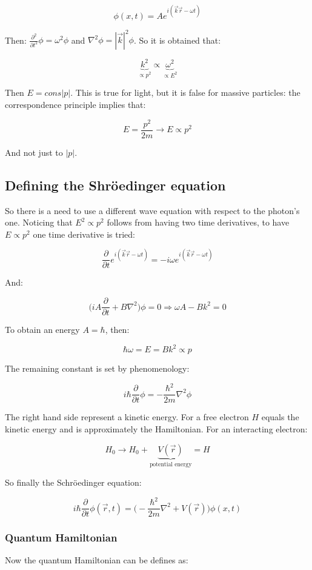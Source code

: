   $$\phi(x,t) = Ae^{i(\vec{k}\vec{r}-\omega t)}$$

  Then: $\frac{\partial^2{}}{\partial{t^2}}\phi = \omega^2\phi$ and $\nabla^2\phi = |\vec{k}|^2\phi$.
  So it is obtained that: 

  $$\underbrace{k^2}_{\propto p^2}\propto\underbrace{\omega^2}_{\propto E^2}$$

  Then $E = cons|p|$.
  This is true for light, but it is false for massive particles: the correspondence principle implies that:

  $$E = \frac{p^2}{2m}\rightarrow E\propto p^2$$

  And not just to $|p|$.

  \subsection{Defining the Shr\"oedinger equation}
  So there is a need to use a different wave equation with respect to the photon's one.
  Noticing that $E^2\propto p^2$ follows from having two time derivatives, to have $E\propto p^2$ one time derivative is tried:

  $$\frac{\partial {}}{\partial {t}}e^{i(\vec{k}\vec{r}-\omega t)} = -i\omega e^{i(\vec{k}\vec{r}-\omega t)}$$

  And:

  $$\biggl(iA \frac{\partial {}}{\partial {t}}+ B\nabla^2\biggr)\phi = 0\Rightarrow \omega A - B k^2 = 0$$

  To obtain an energy $A = \hbar$, then:

  $$\hbar\omega = E = Bk^2\propto p$$

  The remaining constant is set by phenomenology:

  $$i\hbar \frac{\partial {}}{\partial {t}}\phi = -\frac{\hbar^2}{2m}\nabla^2\phi$$

  The right hand side represent a kinetic energy.
  For a free electron $H$ equals the kinetic energy and is approximately the Hamiltonian.
  For an interacting electron:

  $$H_0 \rightarrow H_0 + \underbrace{V(\vec{r})}_{\text{potential energy}} = H$$

  So finally the Schr\"oedinger equation:

  $$i\hbar \frac{\partial {}}{\partial {t}}\phi(\vec{r},t) = \biggl(-\frac{\hbar^2}{2m}\nabla^2+V(\vec{r})\biggr)\phi(x,t)$$

    \subsubsection{Quantum Hamiltonian}
    Now the quantum Hamiltonian can be defines as:

